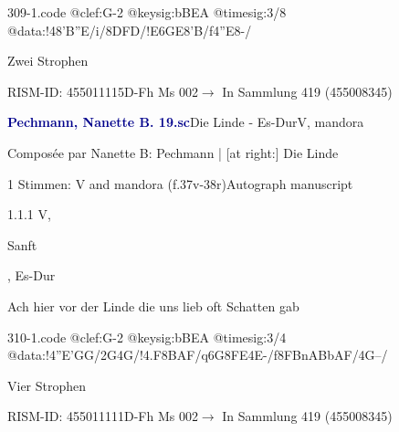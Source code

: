 \documentclass[twocolumn]{book}
\begin{document}
\begin{filecontents*}{309-1.code}
@clef:G-2
@keysig:bBEA
@timesig:3/8
@data:!48'B''E/i/{8DFD}/!E{6GE}8'B/f4''E8-/
\end{filecontents*}
\newline
%
\par Zwei Strophen
\par RISM-ID: 455011115\newline D-Fh  Ms 002\newline $\rightarrow$ In Sammlung 419 (455008345)
      
\par \vspace{7pt} \textcolor{darkblue}{\textbf{Pechmann, Nanette B.  19.sc}}\hfillplus{\textbf{[310]}}\newline Die Linde - Es-Dur\newline V, mandora
\par \begin{itshape}[heading, f.37v:] Composée par Nanette B: Pechmann | [at right:] Die Linde\end{itshape} 
\par \textcolor{darkblue}{}  1 Stimmen: V and mandora  (f.37v-38r)\newline Autograph manuscript
\par 1.1.1  V, \begin{itshape}Sanft\end{itshape}, Es-Dur\newline \begin{footnotesize} Ach hier vor der Linde die uns lieb oft Schatten gab \end{footnotesize}  
\begin{filecontents*}{310-1.code}
@clef:G-2
@keysig:bBEA
@timesig:3/4
@data:!4''E'GG/2G4G/!4.F8BAF/q6G{8FE}4E-/f{8FBnABbAF}/4G--/
\end{filecontents*}
\newline
%
\par Vier Strophen
\par RISM-ID: 455011111\newline D-Fh  Ms 002\newline $\rightarrow$ In Sammlung 419 (455008345)
      
\end{document}
